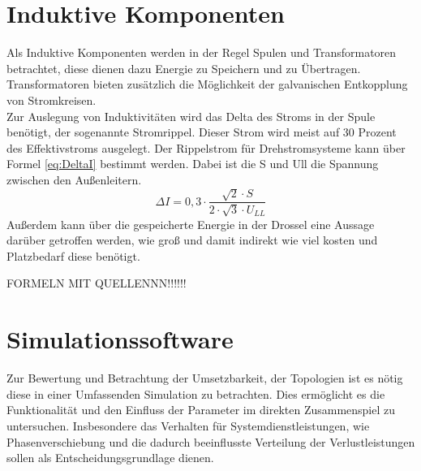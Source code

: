 \section{Induktive Komponenten}
	Als Induktive Komponenten werden in der Regel Spulen und Transformatoren betrachtet, diese dienen dazu Energie zu Speichern und zu Übertragen. Transformatoren bieten zusätzlich die Möglichkeit der galvanischen Entkopplung von Stromkreisen.\\ 
	Zur Auslegung von Induktivitäten wird das Delta des Stroms in der Spule benötigt, der sogenannte Stromrippel. Dieser Strom wird meist auf 30 Prozent des Effektivstroms ausgelegt. Der Rippelstrom für Drehstromsysteme kann über Formel \ref{eq:DeltaI} bestimmt werden. Dabei ist die \gls{S} und \gls{Ull} die Spannung zwischen den Außenleitern.\\
	\begin{equation}
		\label{eq:DeltaI}
		 \Delta I = 0,3 \cdot \dfrac{\sqrt{2} \cdot S}{2 \cdot \sqrt{3} \cdot U_{LL}}
	\end{equation}
	Außerdem kann über die gespeicherte Energie in der Drossel eine Aussage darüber getroffen werden, wie groß und damit indirekt wie viel kosten und Platzbedarf diese benötigt.
	
	FORMELN MIT QUELLENNN!!!!!!



\section{Simulationssoftware}
	Zur Bewertung und Betrachtung der Umsetzbarkeit, der Topologien ist es nötig diese in einer Umfassenden Simulation zu betrachten. Dies ermöglicht es die Funktionalität und den Einfluss der Parameter im direkten Zusammenspiel zu untersuchen. Insbesondere das Verhalten für Systemdienstleistungen, wie Phasenverschiebung und die dadurch beeinflusste Verteilung der Verlustleistungen sollen als Entscheidungsgrundlage dienen. 

